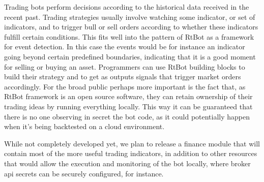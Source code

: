 \documentclass[preprint,1p,times]{elsarticle}
\begin{document}
Trading bots perform decisions according to the historical data received in the recent past. Trading strategies 
usually involve watching some indicator, or set of indicators, and to trigger bull or sell orders according to 
whether these indicators fulfill certain conditions. This fits well into the pattern of RtBot as a framework for 
event detection. In this case the events would be for instance an indicator going beyond certain predefined 
boundaries, indicating that it is a good moment for selling or buying an asset. Programmers can use RtBot building 
blocks to build their strategy and to get as outputs signals that trigger market orders accordingly. For the broad 
public perhaps more important is the fact that, as RtBot framework is an open source software, they can retain 
ownership of their trading ideas by running everything locally. This way it can be guaranteed that there is no one 
observing in secret the bot code, as it could potentially happen when it’s being backtested on a cloud environment.

While not completely developed yet, we plan to release a finance module that will contain most of the more useful 
trading indicators, in addition to other resources that would allow the execution and monitoring of the bot locally, 
where broker api secrets can be securely configured, for instance.






\begin{thebibliography}{00}


\bibitem{}

\end{thebibliography}
\end{document}
